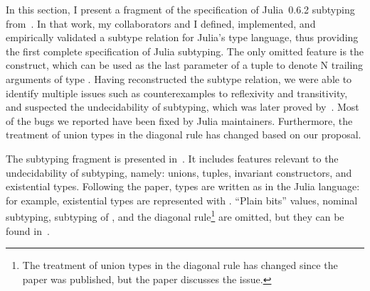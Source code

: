 In this section, I present a fragment of the specification of
Julia~0.6.2 subtyping from~\cite{bib:zappa-nardelli:julia-sub:oopsla:2018}.
In that work, my collaborators and I defined, implemented, and empirically
validated a subtype relation for Julia's type language,
thus providing the first complete specification of Julia subtyping.
The only omitted feature is the
 construct, which can be used as the last
parameter of a tuple to denote N trailing arguments of type .
Having reconstructed the subtype relation,
we were able to identify multiple issues such as
counterexamples to reflexivity and transitivity,
and suspected the undecidability of subtyping,
which was later proved by~\citet{bib:chung:type-julia-thesis:2023}.
Most of the bugs we reported have been fixed by Julia maintainers.
Furthermore, the treatment of union types in the diagonal rule has changed
based on our proposal.

The subtyping fragment is presented in~. 
It includes features relevant to the undecidability of subtyping, namely:
unions, tuples, invariant constructors, and existential types.
Following the paper, types are written as in the Julia language:
for example, existential types are represented with .
``Plain bits'' values, nominal subtyping, 
subtyping of , and the diagonal
rule\footnote{The treatment of union types in the diagonal rule has changed
since the paper was published, but the paper discusses the issue.}
are omitted, but they can be found
in~\cite{bib:zappa-nardelli:julia-sub:oopsla:2018}.

